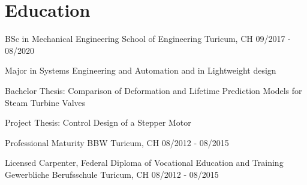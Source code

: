 \vspace{-\acvSectionTopSkip}
\section{Education}
\cventry
{BSc in Mechanical Engineering} %
{School of Engineering} %
{Turicum, CH} %
{09/2017 - 08/2020} %
\begin{cvitems}
\item {Major in Systems Engineering and Automation and in Lightweight design}
\item {Bachelor Thesis: Comparison of Deformation and Lifetime Prediction Models for Steam Turbine Valves}
\item {Project Thesis: Control Design of a Stepper Motor}
\end{cvitems}

\cventry
{Professional Maturity} %
{BBW} %
{Turicum, CH} %
{08/2012 - 08/2015} %

\cventry
{Licensed Carpenter, Federal Diploma of Vocational Education and Training} %
{Gewerbliche Berufsschule} %
{Turicum, CH} %
{08/2012 - 08/2015} %
